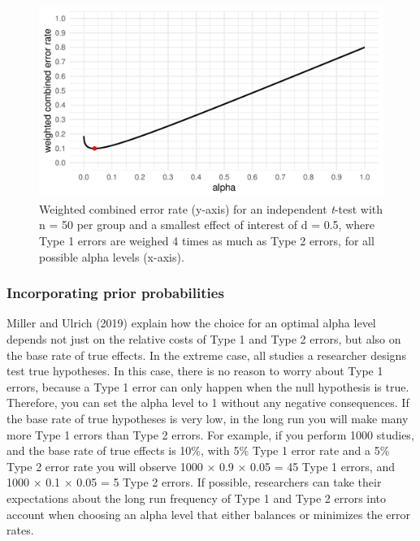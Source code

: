 \documentclass[
  english,
  ,man,floatsintext]{apa6}
\begin{document}
\begin{figure}
\centering
\includegraphics{Justify_in_Practice_files/figure-latex/cost-plot-1.pdf}
\caption{\label{fig:cost-plot}Weighted combined error rate (y-axis) for an independent \emph{t}-test with n = 50 per group and a smallest effect of interest of d = 0.5, where Type 1 errors are weighed 4 times as much as Type 2 errors, for all possible alpha levels (x-axis).}
\end{figure}

\hypertarget{incorporating-prior-probabilities}{%
\subsubsection{Incorporating prior probabilities}\label{incorporating-prior-probabilities}}

Miller and Ulrich (2019) explain how the choice for an optimal alpha level depends not just on the relative costs of Type 1 and Type 2 errors, but also on the base rate of true effects. In the extreme case, all studies a researcher designs test true hypotheses. In this case, there is no reason to worry about Type 1 errors, because a Type 1 error can only happen when the null hypothesis is true. Therefore, you can set the alpha level to 1 without any negative consequences. If the base rate of true hypotheses is very low, in the long run you will make many more Type 1 errors than Type 2 errors. For example, if you perform 1000 studies, and the base rate of true effects is 10\%, with 5\% Type 1 error rate and a 5\% Type 2 error rate you will observe 1000 × 0.9 × 0.05 = 45 Type 1 errors, and 1000 × 0.1 × 0.05 = 5 Type 2 errors. If possible, researchers can take their expectations about the long run frequency of Type 1 and Type 2 errors into account when choosing an alpha level that either balances or minimizes the error rates.
\end{document}
